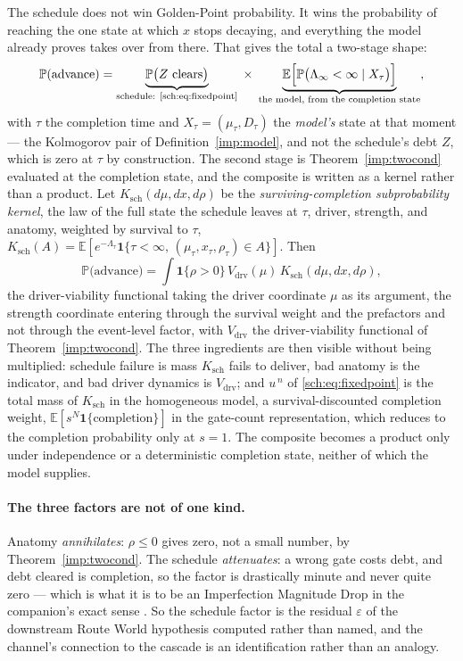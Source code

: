 \documentclass[11pt]{article}
\newcommand{\E}{\mathbb{E}}
\newcommand{\PP}{\mathbb{P}}
\newcommand{\one}{\mathbf{1}}
\theoremstyle{plain}
\theoremstyle{definition}
\theoremstyle{remark}
\begin{document}
The schedule does not win Golden-Point probability. It wins the
probability of reaching the one state at which $x$ stops decaying, and
everything the model already proves takes over from there. That gives
the total a two-stage shape:
\begin{equation}\label{sch:eq:composite}
\PP(\text{advance})
=\underbrace{\PP\bigl(Z\ \text{clears}\bigr)}_{\text{schedule:
\eqref{sch:eq:fixedpoint}}}
\;\times\;
\underbrace{\E\Bigl[\PP\bigl(\Lambda_\infty<\infty\mid X_{\tau}\bigr)
\Bigr]}_{\text{the model, from the completion state}},
\end{equation}
with $\tau$ the completion time and $X_\tau=(\mu_\tau,D_\tau)$ the
\emph{model's} state at that moment --- the Kolmogorov pair of
Definition~\ref{imp:model}, and not the schedule's debt $Z$, which is
zero at $\tau$ by construction. The second stage is Theorem~\ref{imp:twocond} evaluated at the
completion state, and the composite is written as a kernel rather than
a product. Let $K_{\mathrm{sch}}(d\mu,dx,d\rho)$ be the \emph{surviving-completion
subprobability kernel}, the law of the full state the schedule leaves
at $\tau$, driver, strength, and anatomy, weighted by survival to
$\tau$,
$K_{\mathrm{sch}}(A)=\E[e^{-\Lambda_\tau}\one\{\tau<\infty,\,(\mu_\tau,x_\tau,\rho_\tau)\in A\}]$.
Then
\begin{equation}\label{sch:eq:threecond}
\PP\bigl(\text{advance}\bigr)
=\int\one\{\rho>0\}\,V_{\mathrm{drv}}(\mu)\,K_{\mathrm{sch}}(d\mu,dx,d\rho),
\end{equation}
the driver-viability functional taking the driver coordinate $\mu$ as
its argument, the strength coordinate entering through the survival
weight and the prefactors and not through the event-level factor,
with $V_{\mathrm{drv}}$ the driver-viability functional of
Theorem~\ref{imp:twocond}. The three ingredients are then visible without
being multiplied: schedule failure is mass $K_{\mathrm{sch}}$ fails to
deliver, bad anatomy is the indicator, and bad driver dynamics is
$V_{\mathrm{drv}}$; and $u^{\,n}$ of \eqref{sch:eq:fixedpoint} is the
total mass of $K_{\mathrm{sch}}$ in the homogeneous model, a
survival-discounted completion weight, $\E[s^N\one\{\text{completion}\}]$
in the gate-count representation, which reduces to the completion
probability only at $s=1$. The composite becomes a product only under
independence or a deterministic completion state, neither of which the
model supplies.

\paragraph{The three factors are not of one kind.}\label{sch:rem:threefactor}
Anatomy \emph{annihilates}: $\rho\le0$ gives zero, not a small number,
by Theorem~\ref{imp:twocond}. The schedule \emph{attenuates}: a
wrong gate costs debt, and debt cleared is completion, so the factor is
drastically minute and never quite zero --- which is what it is to be an
Imperfection Magnitude Drop in the companion's exact sense \cite{Nexus}.
So the schedule factor is the residual $\varepsilon$ of
the downstream Route World hypothesis computed rather than named, and the
channel's connection to the cascade is an identification rather than an
analogy.
\end{document}
